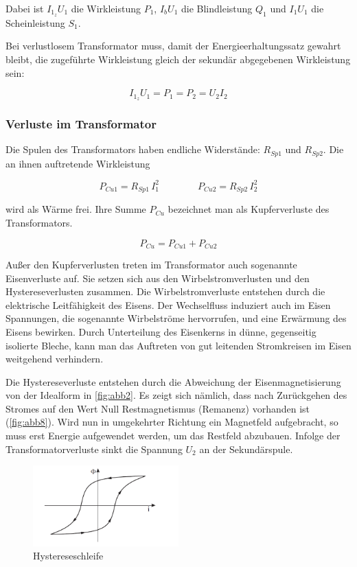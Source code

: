 \documentclass[11pt,ngerman]{scrartcl}
\begin{document}
Dabei ist $I_{1_z} U_1$ die Wirkleistung $P_1$, $I_b U_1$ die Blindleistung $Q_1$ und $I_1 U_1$ die Scheinleistung $S_1$.

Bei verlustlosem Transformator muss, damit der Energieerhaltungssatz gewahrt
bleibt, die zugeführte Wirkleistung gleich der sekundär abgegebenen
Wirkleistung sein:

\begin{equation}
	I_{1_z} U_1 = P_1 = P_2 = U_2 I_2
\end{equation}

\subsubsection{Verluste im Transformator}

Die Spulen des Transformators haben endliche Widerstände: $R_{Sp1}$ und $R_{Sp2}$. Die an ihnen auftretende
Wirkleistung

\begin{equation}
	P_{Cu1} = R_{Sp1} \, I_1^2 \qquad \qquad P_{Cu2} = R_{Sp2} \, I_2^2
\end{equation}

wird als Wärme frei. Ihre Summe $P_{Cu}$ bezeichnet man als Kupferverluste des Transformators.

\begin{equation}
	P_{Cu} = P_{Cu1} + P_{Cu2}
\end{equation}

Außer den Kupferverlusten treten im Transformator auch sogenannte Eisenverluste auf. Sie
setzen sich aus den Wirbelstromverlusten und den Hystereseverlusten zusammen. Die Wirbelstromverluste
entstehen durch die elektrische Leitfähigkeit des Eisens. Der Wechselfluss induziert
auch im Eisen Spannungen, die sogenannte Wirbelströme hervorrufen, und eine Erwärmung des
Eisens bewirken. Durch Unterteilung des Eisenkerns in dünne, gegenseitig isolierte Bleche, kann
man das Auftreten von gut leitenden Stromkreisen im Eisen weitgehend verhindern.

Die Hystereseverluste entstehen durch die Abweichung der Eisenmagnetisierung von der Idealform
in \autoref{fig:abb2}. Es zeigt sich nämlich, dass nach Zurückgehen des Stromes auf den Wert Null
Restmagnetismus (Remanenz) vorhanden ist (\autoref{fig:abb8}). Wird nun in umgekehrter Richtung ein
Magnetfeld aufgebracht, so muss erst Energie aufgewendet werden, um das Restfeld abzubauen.
Infolge der Transformatorverluste sinkt die Spannung $U_2$ an der Sekundärspule.

\begin{figure}[H]
	\begin{center}
		\includegraphics[width=0.5\textwidth]{abb8}
	\end{center}
	\caption{Hystereseschleife}
	\label{fig:abb8}
\end{figure}
\end{document}
